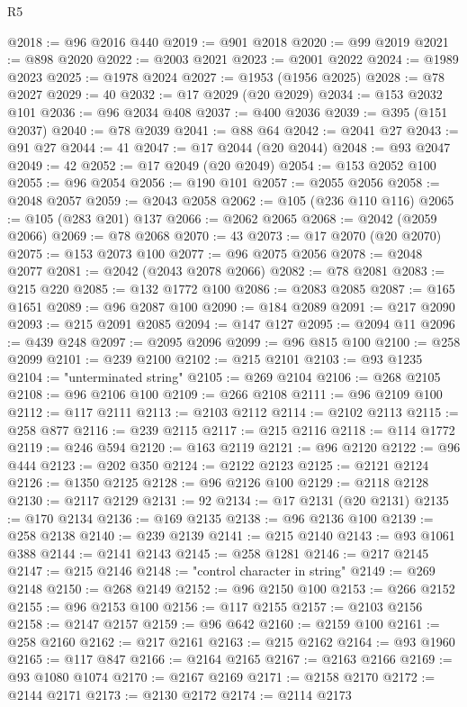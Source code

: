 \begin{lexlean}{R5}
\begin{coremodule}
@2018 := @96 @2016 @440
@2019 := @901 @2018
@2020 := @99 @2019
@2021 := @898 @2020
@2022 := @2003 @2021
@2023 := @2001 @2022
@2024 := @1989 @2023
@2025 := @1978 @2024
@2027 := @1953 (@1956 @2025)
@2028 := @78 @2027
@2029 := 40
@2032 := @17 @2029 (@20 @2029)
@2034 := @153 @2032 @101
@2036 := @96 @2034 @408
@2037 := @400 @2036
@2039 := @395 (@151 @2037)
@2040 := @78 @2039
@2041 := @88 @64
@2042 := @2041 @27
@2043 := @91 @27
@2044 := 41
@2047 := @17 @2044 (@20 @2044)
@2048 := @93 @2047
@2049 := 42
@2052 := @17 @2049 (@20 @2049)
@2054 := @153 @2052 @100
@2055 := @96 @2054
@2056 := @190 @101
@2057 := @2055 @2056
@2058 := @2048 @2057
@2059 := @2043 @2058
@2062 := @105 (@236 @110 @116)
@2065 := @105 (@283 @201) @137
@2066 := @2062 @2065
@2068 := @2042 (@2059 @2066)
@2069 := @78 @2068
@2070 := 43
@2073 := @17 @2070 (@20 @2070)
@2075 := @153 @2073 @100
@2077 := @96 @2075 @2056
@2078 := @2048 @2077
@2081 := @2042 (@2043 @2078 @2066)
@2082 := @78 @2081
@2083 := @215 @220
@2085 := @132 @1772 @100
@2086 := @2083 @2085
@2087 := @165 @1651
@2089 := @96 @2087 @100
@2090 := @184 @2089
@2091 := @217 @2090
@2093 := @215 @2091 @2085
@2094 := @147 @127
@2095 := @2094 @11
@2096 := @439 @248
@2097 := @2095 @2096
@2099 := @96 @815 @100
@2100 := @258 @2099
@2101 := @239 @2100
@2102 := @215 @2101
@2103 := @93 @1235
@2104 := "unterminated string"
@2105 := @269 @2104
@2106 := @268 @2105
@2108 := @96 @2106 @100
@2109 := @266 @2108
@2111 := @96 @2109 @100
@2112 := @117 @2111
@2113 := @2103 @2112
@2114 := @2102 @2113
@2115 := @258 @877
@2116 := @239 @2115
@2117 := @215 @2116
@2118 := @114 @1772
@2119 := @246 @594
@2120 := @163 @2119
@2121 := @96 @2120
@2122 := @96 @444
@2123 := @202 @350
@2124 := @2122 @2123
@2125 := @2121 @2124
@2126 := @1350 @2125
@2128 := @96 @2126 @100
@2129 := @2118 @2128
@2130 := @2117 @2129
@2131 := 92
@2134 := @17 @2131 (@20 @2131)
@2135 := @170 @2134
@2136 := @169 @2135
@2138 := @96 @2136 @100
@2139 := @258 @2138
@2140 := @239 @2139
@2141 := @215 @2140
@2143 := @93 @1061 @388
@2144 := @2141 @2143
@2145 := @258 @1281
@2146 := @217 @2145
@2147 := @215 @2146
@2148 := "control character in string"
@2149 := @269 @2148
@2150 := @268 @2149
@2152 := @96 @2150 @100
@2153 := @266 @2152
@2155 := @96 @2153 @100
@2156 := @117 @2155
@2157 := @2103 @2156
@2158 := @2147 @2157
@2159 := @96 @642
@2160 := @2159 @100
@2161 := @258 @2160
@2162 := @217 @2161
@2163 := @215 @2162
@2164 := @93 @1960
@2165 := @117 @847
@2166 := @2164 @2165
@2167 := @2163 @2166
@2169 := @93 @1080 @1074
@2170 := @2167 @2169
@2171 := @2158 @2170
@2172 := @2144 @2171
@2173 := @2130 @2172
@2174 := @2114 @2173

\end{coremodule}
\end{lexlean}
